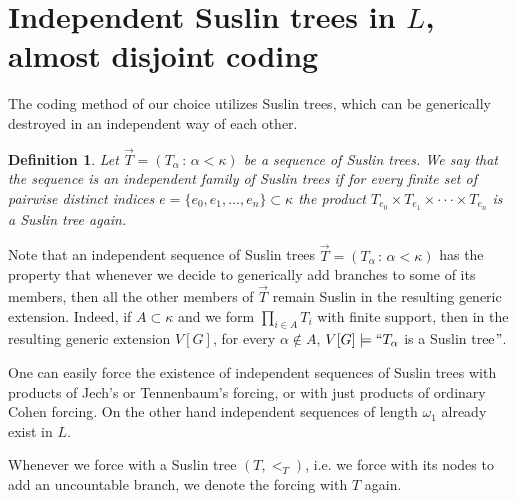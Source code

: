 \documentclass[a4paper,11pt]{article}
\newtheorem{definition}[theorem]{Definition}
\begin{document}
\section{Independent Suslin trees in $L$, almost disjoint coding}
The coding method of our choice utilizes Suslin trees, which can be generically destroyed in an independent way of each other. 
\begin{definition}
 Let $\vec{T} = (T_{\alpha} \, : \, \alpha < \kappa)$ be a sequence of Suslin trees. We say that the sequence is an 
 independent family of Suslin trees if for every finite set of pairwise distinct indices $e= \{e_0, e_1,...,e_n\} \subset \kappa$ the product $T_{e_0} \times T_{e_1} \times \cdot \cdot \cdot \times T_{e_n}$ 
 is a Suslin tree again.
\end{definition}
Note that an independent sequence of Suslin trees $\vec{T} = (T_{\alpha} \, : \, \alpha < \kappa)$ has the property that whenever we decide to generically add branches to some of its members, then all the other members of $\vec{T}$ remain Suslin in the resulting generic extension. Indeed, if $A \subset \kappa$ and we form 
$ \prod_{i \in A} T_i $
with finite support, then in the resulting generic extension $V[G]$, for every $\alpha \notin A$, $V[G] \models `` T_{\alpha}$ is a Suslin tree$"$.

One can easily force the existence of independent sequences of Suslin trees with products of Jech's or Tennenbaum's forcing, or with just products of ordinary Cohen forcing. On the other hand independent sequences of length $\omega_1$ already exist in $L$. 


Whenever we force with a Suslin tree $(T,<_T)$, i.e. we force with its nodes to add an uncountable branch, we denote the forcing with $T$ again.
\end{document}
